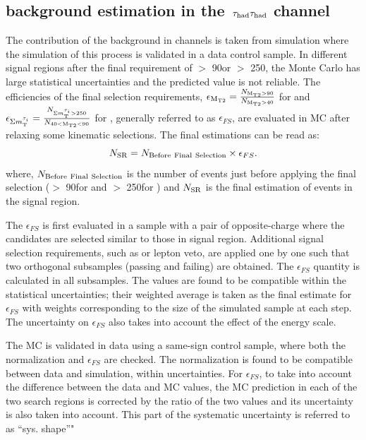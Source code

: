 \subsection{\texorpdfstring{\wjets background estimation in the $\,\tau_{\rm had}\tau_{\rm had}$ channel}{W+jets background estimation in the tau-tau channel}}
\label{sect:bkgW}
The contribution of the \wjets background in \tauTau channels is taken from simulation where the simulation of this process is validated in a data control sample. 
In different signal regions after the final requirement of \mttwo $>$ 90\GeV or \SumMT $>$ 250\GeV, 
the \wjets Monte Carlo has large statistical uncertainties and the predicted value is not reliable. 
The efficiencies of the final selection requirements, $\epsilon_{\rm M_{T2}}=\frac{N_{\rm M_{T2}>90}}{N_{\rm M_{T2}>40}}$ for  \binone and $\epsilon_{\Sigma m_{\rm T}^{\tau_i}}=\frac{N_{\Sigma m_{\rm T}^{\tau_i}>250}}{N_{40<\rm M_{T2}<90}}$ for \bintwo, generally referred to as $\epsilon_{FS}$, are evaluated in MC after relaxing some kinematic selections. 
The final estimations can be read as:
\begin{equation}
N_{\rm SR} = N_{\rm Before~Final~Selection} \times \epsilon_{FS}.
\end{equation}
where, $N_{\rm Before~Final~Selection}$ is the number of \wjets events just before applying the final selection 
(\mttwo $>$ 90\GeV for \binone and \SumMT $>$ 250\GeV for \bintwo) and $N_{\rm SR}$ is the final estimation of \wjets events in the signal region.


The $\epsilon_{FS}$ is first evaluated in a \wjets sample with a pair of opposite-charge \Tau where the \Tau candidates are selected similar to those in signal region. 
Additional signal selection requirements, such as \deltaphi or lepton veto, are applied one by one such that two orthogonal subsamples (passing and failing) are obtained. The $\epsilon_{FS}$ quantity is calculated in all subsamples. The values are found to be compatible within the statistical uncertainties; their weighted average is taken as the final estimate for $\epsilon_{FS}$ with weights corresponding to the size of the simulated sample at each step. %
The uncertainty on $\epsilon_{FS}$  also takes into account the effect of the \Tau energy scale.

The \wjets MC is validated in data using a same-sign \muTau control sample, where both the normalization and $\epsilon_{FS}$ are checked. 
The normalization is found to be compatible between data and simulation, within uncertainties. For $\epsilon_{FS}$, 
to take into account the difference between the data and MC values, the MC prediction in each
of the two search regions is corrected by the ratio of the two values and its uncertainty is also
taken into account. This part of the systematic uncertainty is referred to as ``sys. shape''"

